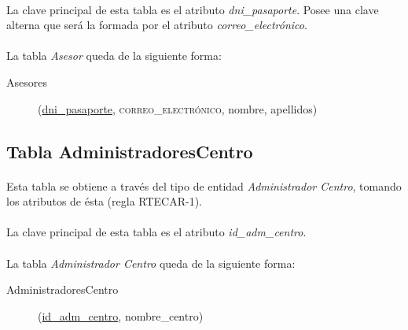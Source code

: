       \paragraph{}La clave principal de esta tabla es el atributo
      \textit{dni\_pasaporte}. Posee una clave alterna que será la formada por
      el atributo \textit{correo\_electrónico}.

      \paragraph{}La tabla \textit{Asesor} queda de la siguiente forma:

      \begin{description}
         \item[Asesores] \begin{flushleft}(\underline{dni\_pasaporte},
         \textsc{correo\_electrónico}, nombre, apellidos)\end{flushleft}
      \end{description}

   \subsection{Tabla AdministradoresCentro}

      \paragraph{}Esta tabla se obtiene a través del tipo de entidad
      \textit{Administrador Centro}, tomando los atributos de ésta (regla
      RTECAR-1).

      \paragraph{}La clave principal de esta tabla es el atributo
      \textit{id\_adm\_centro}.

      \paragraph{}La tabla \textit{Administrador Centro} queda de la siguiente
      forma:

      \begin{description}
         \item[AdministradoresCentro] \begin{flushleft}(\underline{id\_adm\_centro},
         nombre\_centro)\end{flushleft}
      \end{description}

